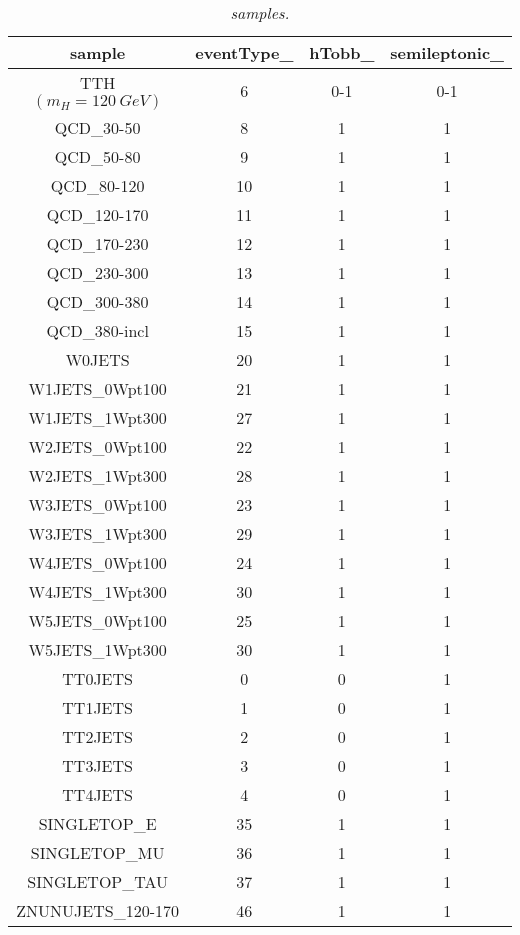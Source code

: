 \documentclass[12pt,a4paper,twoside,english]{report}
\begin{document}
\begin{table}[h!]
  \center
  \begin{tabular}{||c|c|c|c||}
    \hline
    \hline
    sample & eventType\_ & hTobb\_ & semileptonic\_\\
    \hline
    TTH $(m_H=120\ GeV)$ & 6 & 0-1 & 0-1\\
    \hline
    QCD\_30-50    &  8 & 1 & 1\\
    QCD\_50-80    &  9 & 1 & 1\\
    QCD\_80-120   & 10 & 1 & 1\\ 
    QCD\_120-170  & 11 & 1 & 1\\
    QCD\_170-230  & 12 & 1 & 1\\
    QCD\_230-300  & 13 & 1 & 1\\
    QCD\_300-380  & 14 & 1 & 1\\
    QCD\_380-incl & 15 & 1 & 1\\
    \hline
    W0JETS          & 20 & 1 & 1\\
    W1JETS\_0Wpt100 & 21 & 1 & 1\\
    W1JETS\_1Wpt300 & 27 & 1 & 1\\
    W2JETS\_0Wpt100 & 22 & 1 & 1\\
    W2JETS\_1Wpt300 & 28 & 1 & 1\\
    W3JETS\_0Wpt100 & 23 & 1 & 1\\
    W3JETS\_1Wpt300 & 29 & 1 & 1\\
    W4JETS\_0Wpt100 & 24 & 1 & 1\\
    W4JETS\_1Wpt300 & 30 & 1 & 1\\
    W5JETS\_0Wpt100 & 25 & 1 & 1\\
    W5JETS\_1Wpt300 & 30 & 1 & 1\\
    \hline
    TT0JETS & 0 & 0 & 1\\
    TT1JETS & 1 & 0 & 1\\
    TT2JETS & 2 & 0 & 1\\
    TT3JETS & 3 & 0 & 1\\
    TT4JETS & 4 & 0 & 1\\
    \hline
    SINGLETOP\_E   & 35 & 1 & 1\\
    SINGLETOP\_MU  & 36 & 1 & 1\\
    SINGLETOP\_TAU & 37 & 1 & 1\\
    \hline
    ZNUNUJETS\_120-170 & 46 & 1 & 1\\
    \hline
    \hline
  \end{tabular}
  \center\caption{\footnotesize{\em samples.}}
  \label{t:ttjets_sample}
\end{table}
\end{document}
